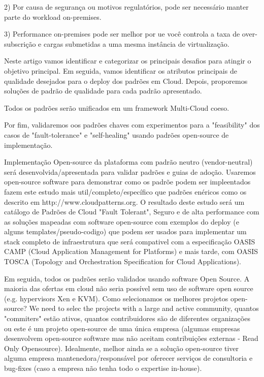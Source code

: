 \documentclass[12pt]{article}
\begin{document}
		2) Por causa de segurança ou motivos regulatórios, pode ser necessário manter parte do workload on-premises.
		
		3) Performance on-premises pode ser melhor por ue você controla a taxa de over-subscrição e cargas submetidas a uma mesma instância de virtualização.
		
		Neste artigo vamos identificar e categorizar os principais desafios para atingir o objetivo principal. Em seguida, vamos identificar os atributos principais de qualidade desejados para o deploy dos padrões em Cloud. Depois, proporemos soluções de padrão de qualidade para cada padrão apresentado. 
		
		Todos os padrões serão unificados em um framework Multi-Cloud coeso.
		
		Por fim, validaremos oos padrões chaves com experimentos para a "feasibility" dos casos de "fault-tolerance" e "self-healing" usando padrões open-source de implementação.
		
		Implementação Open-source da plataforma com padrão neutro (vendor-neutral) será desenvolvida/apresentada para validar padrões e guias de adoção. Usaremos open-source software para demonstrar como os padrõe podem ser impleentados fazem este estudo mais util/completo/específico que padrões enéricos como os descrito em http://www.cloudpatterns.org.
		O resultado deste estudo será um catálogo de Padrões de Cloud "Fault Tolerant", Seguro e de alta performance com as soluções mapeadas com software open-source com exemplos do deploy (e alguns templates/pseudo-codigo) que podem ser usados para implementar um stack completo de infraestrutura que será compativel com a especificação OASIS CAMP (Cloud Application Management for Platforms) e mais tarde, com OASIS TOSCA (Topology and Orchestration Specification for Cloud Applications).
		
		Em seguida, todos os padrões serão validados usando software Open Source. A maioria das ofertas em cloud não seria possível sem uso de software open source (e.g. hypervisors Xen e KVM). Como selecionamos os melhores projetos open-source? We need to selec the projects with a large and active community, quantos "commiters" estão ativos, quantos contribuidores são de diferentes organizações ou este é um projeto open-source de uma única empresa (algumas empresas desenvolvem open-source software mas não aceitam contribuições externas - Read Only Opensource). Idealmente, melhor ainda se a solução open-source tiver alguma empresa mantenedora/responsável por oferecer serviços de consultoria e bug-fixes (caso a empresa não tenha todo o expertise in-house). 
		
\end{document}
